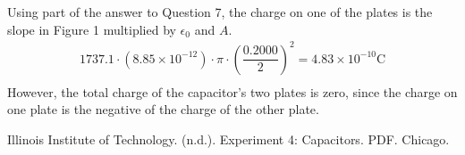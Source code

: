 \documentclass [12pt, letterpaper, twoside] {article}
\begin{document}
\begin{enumerate}
  Using part of the answer to Question 7, the charge on one of the plates is the slope in Figure 1 multiplied by \(\epsilon_{0}\) and \(A\).
  \begin{equation*}
    \begin{split}
      1737.1\cdot(8.85\times10^{-12})\cdot\pi\cdot{\left(\dfrac{0.2000}{2}\right)}^2 = 4.83\times10^{-10} \text{C} \\ %
    \end{split}
  \end{equation*}
  However, the total charge of the capacitor's two plates is zero, since the charge on one plate is the negative of the charge of the other plate.
\end{enumerate}

\voltage

\begin {figure}
  \centering
  \caption {}
\end {figure}

  Illinois Institute of Technology. (n.d.). Experiment 4: Capacitors. PDF. Chicago.
\end{document}
